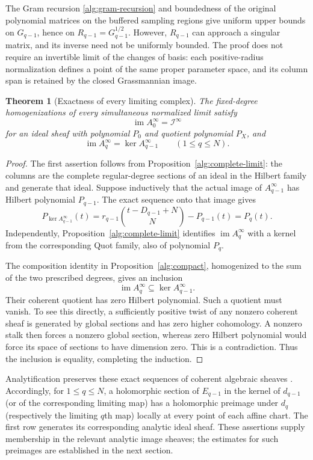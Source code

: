 \documentclass[11pt,reqno]{amsart}
\numberwithin{equation}{section}
\newtheorem{theorem}{Theorem}[section]
\theoremstyle{definition}
\theoremstyle{remark}
\begin{document}
The Gram recursion \eqref{alg:gram-recursion} and boundedness of the
original polynomial matrices on the buffered sampling regions give
uniform upper bounds on $G_{q-1}$, hence on $R_{q-1}=G_{q-1}^{1/2}$.
However, $R_{q-1}$ can approach a singular matrix, and its inverse
need not be uniformly bounded. The proof does not require an invertible
limit of the changes of basis: each positive-radius normalization defines
a point of the same proper parameter space, and its column span is
retained by the closed Grassmannian image.

\begin{theorem}[Exactness of every limiting complex]
\label{alg:exact-limit}
The fixed-degree homogenizations of every simultaneous normalized limit
satisfy
\[
 \operatorname{im}A_0^\infty=\mathscr I^\infty
\]
for an ideal sheaf with polynomial \(P_0\) and quotient polynomial
\(P_X\), and
\[
 \operatorname{im}A_q^\infty=\ker A_{q-1}^\infty
 \qquad(1\leq q\leq N).
\]
\end{theorem}

\begin{proof}
The first assertion follows from
Proposition~\ref{alg:complete-limit}: the columns are the complete
regular-degree sections of an ideal in the Hilbert family and generate
that ideal. Suppose inductively that the actual image of
\(A_{q-1}^\infty\) has Hilbert polynomial \(P_{q-1}\).
The exact sequence onto that image gives
\[
 P_{\ker A_{q-1}^\infty}(t)
 =
 r_{q-1}\binom{t-D_{q-1}+N}{N}-P_{q-1}(t)
 =
 P_q(t).
 \]
Independently, Proposition~\ref{alg:complete-limit} identifies
\(\operatorname{im}A_q^\infty\) with a kernel from the corresponding
Quot family, also of polynomial \(P_q\).

The composition identity in Proposition~\ref{alg:compact},
homogenized to the sum of the two prescribed degrees, gives an
inclusion
\[
 \operatorname{im}A_q^\infty\subseteq\ker A_{q-1}^\infty.
\]
Their coherent quotient has zero Hilbert polynomial. Such a quotient
must vanish. To see this directly, a sufficiently positive twist of
any nonzero coherent sheaf is generated by global sections and has
zero higher cohomology. A nonzero stalk then forces a nonzero global
section, whereas zero Hilbert polynomial would force its space of
sections to have dimension zero. This is a contradiction.
Thus the inclusion is equality, completing the induction.
\end{proof}

Analytification preserves these exact sequences of coherent algebraic
sheaves \cite[Proposition~10]{SerreGAGA}. Accordingly, for
$1\leq q\leq N$, a holomorphic section of $E_{q-1}$ in the kernel
of $d_{q-1}$ (or of the corresponding limiting map) has a holomorphic
preimage under $d_q$ (respectively the limiting $q$th map) locally at
every point of each affine chart. The first row generates its
corresponding analytic ideal sheaf. These assertions supply membership
in the relevant analytic image sheaves;
the estimates for such preimages are established in the next section.
\end{document}
